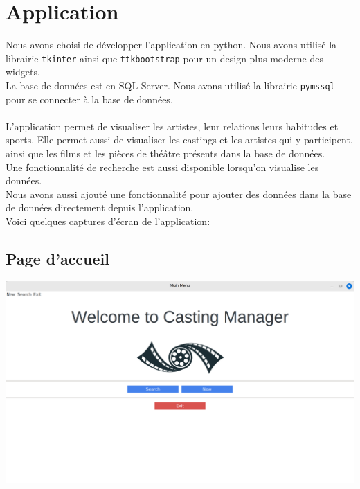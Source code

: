 \documentclass{article}
\newcommand{\n}{\\ [6pt]}
\begin{document}
\newpage
\section{Application}
Nous avons choisi de développer l'application en python. Nous avons
utilisé la librairie \texttt{tkinter} ainsi que \texttt{ttkbootstrap}
pour un design plus moderne des widgets.\n
La base de données est en SQL Server. Nous avons utilisé la librairie
\texttt{pymssql} pour se connecter à la base de données.\n\n
L'application permet de visualiser les artistes, leur relations
leurs habitudes et sports. Elle permet aussi de visualiser les
castings et les artistes qui y participent, ainsi que les films et les
pièces de théâtre présents dans la base de données.\n
Une fonctionnalité de recherche est aussi disponible lorsqu'on
visualise les données.\n
Nous avons aussi ajouté une fonctionnalité pour ajouter des données
dans la base de données directement depuis l'application.\n
Voici quelques captures d'écran de l'application:

\vspace{10mm}

\subsection{Page d'accueil}

\begin{center}
  \includegraphics[scale=0.16]{home.png}
\end{center}

\newpage
\end{document}
